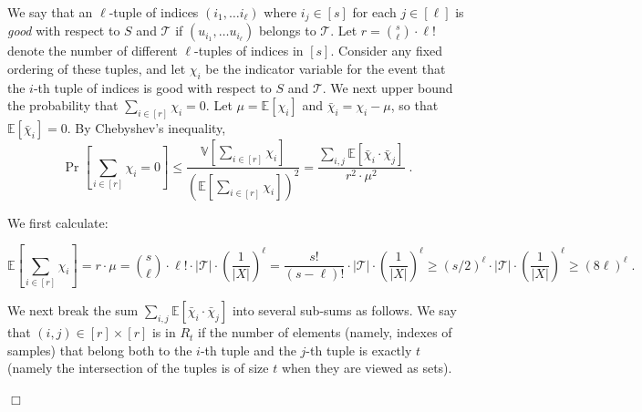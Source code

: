 \documentclass{article}
\newcommand{\Ex}{\mathbb{E}}
\newcommand{\Var}{\mathbb{V}}
\newcommand{\calT}{{\mathcal{T}}}
\newenvironment{proof}{\smallskip\noindent{\bf Proof:}}%
        {\hspace*{\fill}$\Box$\par}
\newcommand{\commentt}[1]{ {}}
\begin{document}
\begin{proof}
We say that an $\ell$-tuple of indices $(i_1, \ldots i_\ell)$ where $i_j \in [s]$ for each $j\in [\ell]$ is \emph{good} with respect to $S$ and $\mathcal{T}$ if $(u_{i_1}, \ldots u_{i_\ell})$ belongs to $\mathcal{T}$.
Let $r = {s \choose \ell } \cdot \ell!$ denote the number of different $\ell$-tuples of indices in $[s]$.  %
Consider any fixed ordering of these tuples, and let $\chi_i$ 
be the indicator variable for the event that the $i$-th tuple of indices is good with respect to $S$ and $\mathcal{T}$.
We next upper bound the probability that
$\sum_{i \in [r]} \chi_{i}=0$.
Let $\mu = \Ex[\chi_i]$ and $\bar{\chi}_{i} = \chi_{i} - \mu$, so that $\Ex[\bar{\chi}_{i}] = 0$.
By Chebyshev's inequality,
\begin{equation}\label{eq:cheb-Ck}
\Pr\left[\sum_{i\in [r]}\chi_{i}=0\right] \leq \frac{\Var\left[\sum_{i\in [r]}\chi_{i}\right]}{\left(\Ex\left[\sum_{i\in [r]}\chi_{i}\right]\right)^2}
= \frac{\sum_{i,j} \Ex[\bar{\chi}_{i}\cdot \bar{\chi}_{j}]}{r^2\cdot \mu^2} \;.
\end{equation}

We first calculate:

\begin{equation}
\Ex\left[\sum_{i\in [r]}\chi_{i}\right] = r \cdot \mu = {s \choose \ell } \cdot \ell! \cdot |\mathcal{T}| \cdot \left(\frac{1}{|X|}\right)^{\ell}
= \frac{s!}{(s-\ell)!} \cdot |\calT| \cdot \left(\frac{1}{|X|}\right)^{\ell} \geq (s/2)^\ell \cdot |\calT| \cdot \left(\frac{1}{|X|}\right)^{\ell}  \geq (8\ell)^\ell\;.
\end{equation}

We next break the sum $\sum_{i,j} \Ex[\bar{\chi}_{i}\cdot \bar{\chi}_{j}]$ into several sub-sums as follows.
We say that $(i,j) \in [r]\times [r]$ is in $R_t$ if the number of elements (namely, indexes of samples) that belong both to the $i$-th tuple and the $j$-th tuple is exactly $t$ (namely the intersection of the tuples is of size $t$ when they are viewed as sets).


\end{proof}
\end{document}
